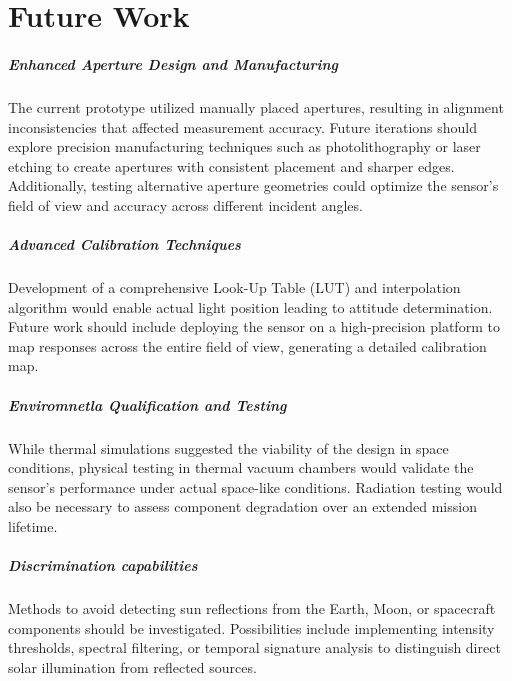 \chapter{Future Work}


\paragraph{Enhanced Aperture Design and Manufacturing}

The current prototype utilized manually placed apertures, resulting in alignment inconsistencies that affected measurement accuracy. 
Future iterations should explore precision manufacturing techniques such as photolithography or laser etching to create apertures with consistent placement and sharper edges. 
Additionally, testing alternative aperture geometries could optimize the sensor's field of view and accuracy across different incident angles.

\paragraph{Advanced Calibration Techniques}

Development of a comprehensive Look-Up Table (LUT) and interpolation algorithm would enable actual light position leading to attitude determination. 
Future work should include deploying the sensor on a high-precision platform to map responses across the entire field of view, generating a detailed calibration map.

\paragraph{Enviromnetla Qualification and Testing}

While thermal simulations suggested the viability of the design in space conditions, physical testing in thermal vacuum chambers would validate the sensor's performance under actual space-like conditions. 
Radiation testing would also be necessary to assess component degradation over an extended mission lifetime.

\paragraph{Discrimination capabilities}

Methods to avoid detecting sun reflections from the Earth, Moon, or spacecraft components should be investigated. 
Possibilities include implementing intensity thresholds, spectral filtering, or temporal signature analysis to distinguish direct solar illumination from reflected sources.